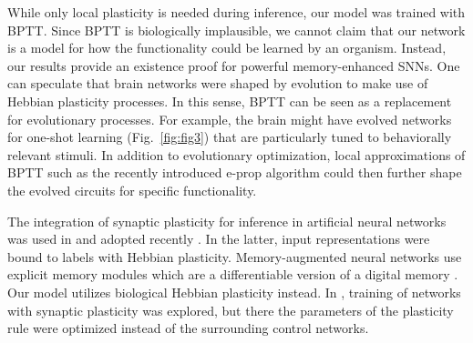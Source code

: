 \documentclass{article}
\begin{document}
While only local plasticity is needed during inference, our model was trained with \gls{BPTT}. Since \gls{BPTT} is biologically implausible, we cannot claim that our network is a model for how the functionality could be learned by an organism. 
Instead, our results provide an existence proof for powerful memory-enhanced SNNs. One can speculate that brain networks were shaped by evolution to make use of Hebbian plasticity processes. In this sense, \gls{BPTT} can be seen as a replacement for evolutionary processes. For example, the brain might have evolved networks for one-shot learning (Fig.~\ref{fig:fig3}) that are particularly tuned to behaviorally relevant stimuli. In addition to evolutionary optimization, local approximations of \gls{BPTT} such as the recently introduced e-prop algorithm \cite{bellec2020solution} could then further shape the evolved circuits for specific functionality.

The integration of synaptic plasticity for inference in artificial neural networks was used in \cite{hinton1987using,schmidhuber1992learning} and adopted recently \cite{ba2016using,munkhdalai2018metalearning}. In the latter, input representations were bound to labels with Hebbian plasticity. 
Memory-augmented neural networks use explicit memory modules which are a differentiable version of a digital memory \cite{weston2015towards,sukhbaatar2015end,graves2016hybrid,miller2016key,xiong2016dynamic,chandar2016hierarchical,gulcehre2018dynamic}. Our model utilizes biological Hebbian plasticity instead. In \cite{miconi2018differentiable}, training of networks with synaptic plasticity was explored, but there the parameters of the plasticity rule were optimized instead of the surrounding control networks.
\end{document}
